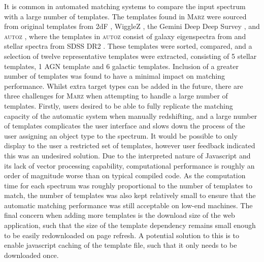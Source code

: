 \documentclass[iop]{emulateapj}
\newcommand{\autoz}{\textsc{autoz}}
\newcommand{\marz}{\textsc{Marz}}
\begin{document}
It is common in automated matching systems to compare the input spectrum with a large number of templates. The templates found in \marz{} were sourced from original templates from 2dF \citep{colless2001}, WiggleZ \citep{Drinkwater21012010}, the Gemini Deep Deep Survey \citet{abraham2004}, and \autoz{} \citep{baldry2014galaxy}, where the templates in \autoz{}  consist of galaxy eigenspectra from \citet{bolton2012} and stellar spectra from SDSS DR2 \citep{SubbaRao2002}. These templates were sorted, compared, and a selection of twelve representative templates were extracted, consisting of 5 stellar templates, 1 AGN template and 6 galactic templates. Inclusion of a greater number of templates was found to have a minimal impact on matching performance. Whilst extra target types can be added in the future, there are three challenges for \marz{} when attempting to handle a large number of templates. Firstly, users desired to be able to fully replicate the matching capacity of the automatic system when manually redshifting, and a large number of templates complicates the user interface and slows down the process of the user assigning an object type to the spectrum. It would be possible to only display to the user a restricted set of templates, however user feedback indicated this was an undesired solution. Due to the interpreted nature of Javascript and its lack of vector processing capability, computational performance is roughly an order of magnitude worse than on typical compiled code. As the computation time for each spectrum was roughly proportional to the number of templates to match, the number of templates was also kept relatively small to ensure that the automatic matching performance was still acceptable on low-end machines. The final concern when adding more templates is the download size of the web application, such that the size of the template dependency remains small enough to be easily redownloaded on page refresh. A potential solution to this is to enable javascript caching of the template file, such that it only needs to be downloaded once.
\end{document}
